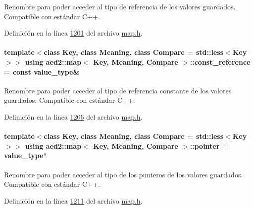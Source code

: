 Renombre para poder acceder al tipo de referencia de los valores guardados. Compatible con estándar C++. 



Definición en la línea \hyperlink{map_8h_source_l01201}{1201} del archivo \hyperlink{map_8h_source}{map.\+h}.

\paragraph[{\texorpdfstring{const\+\_\+reference}{const_reference}}]{\setlength{\rightskip}{0pt plus 5cm}template$<$class Key, class Meaning, class Compare = std\+::less$<$\+Key$>$$>$ using {\bf aed2\+::map}$<$ Key, Meaning, Compare $>$\+::{\bf const\+\_\+reference} =  const {\bf value\+\_\+type}\&}\hypertarget{classaed2_1_1map_a277080d3db76f19df9319ecba16475a9_a277080d3db76f19df9319ecba16475a9}{}\label{classaed2_1_1map_a277080d3db76f19df9319ecba16475a9_a277080d3db76f19df9319ecba16475a9}


Renombre para poder acceder al tipo de referencia constante de los valores guardados. Compatible con estándar C++. 



Definición en la línea \hyperlink{map_8h_source_l01206}{1206} del archivo \hyperlink{map_8h_source}{map.\+h}.

\paragraph[{\texorpdfstring{pointer}{pointer}}]{\setlength{\rightskip}{0pt plus 5cm}template$<$class Key, class Meaning, class Compare = std\+::less$<$\+Key$>$$>$ using {\bf aed2\+::map}$<$ Key, Meaning, Compare $>$\+::{\bf pointer} =  {\bf value\+\_\+type}$\ast$}\hypertarget{classaed2_1_1map_a7394e98a23b86bc008ad73326b273fd5_a7394e98a23b86bc008ad73326b273fd5}{}\label{classaed2_1_1map_a7394e98a23b86bc008ad73326b273fd5_a7394e98a23b86bc008ad73326b273fd5}


Renombre para poder acceder al tipo de los punteros de los valores guardados. Compatible con estándar C++. 



Definición en la línea \hyperlink{map_8h_source_l01211}{1211} del archivo \hyperlink{map_8h_source}{map.\+h}.

